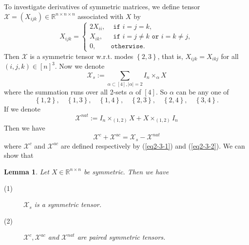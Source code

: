\documentclass[11pt, oneside]{article}  %
\newtheorem{lem}[thm]{Lemma}
\newcommand{\abs}[1]{\left\vert#1\right\vert}
\newcommand{\set}[1]{\left\{#1\right\}}
\newcommand{\al}{\alpha}
\newcommand{\RR}{\mathbb{R}}
\newcommand{\X}{\mathcal{X}}
\newcommand{\beq}{\begin{equation}}
\newcommand{\eeq}{\end{equation}}
\begin{document}
To investigate derivatives of symmetric matrices, we define tensor $\X=(X_{ijk})\in\RR^{n\times n\times n}$ associated with $X$ by 
\[
X_{ijk} = \begin{cases}
2X_{ii},  & \texttt{  if\ }  i=j=k,\\
X_{ik},  & \texttt{  if\ }  i=j\neq k \texttt{ or\ } i=k\neq j, \\ 
0,           & \texttt {otherwise}. 
\end{cases}
\]
Then $\X$ is a symmetric tensor w.r.t. modes $\set{2,3}$, that is,  $X_{ijk}=X_{ikj}$ for all $(i,j,k)\in [n]^{3}$.  Now we denote 
\beq\label{eq3-1:Xs} 
\X_{s} := \sum_{\al\subset [4],\abs{\al}=2} I_{n}\times_{\al} X
\eeq
where the summation runs over all 2-sets $\al$ of $[4]$. So $\al$ can be any one of  
\[ \set{1,2},\quad \set{1,3},\quad \set{1,4},\quad \set{2,3},\quad \set{2,4},\quad \set{3,4}. \]  
If we denote 
\beq\label{eq3-1:X-I-n} 
\X^{nat} := I_{n}\times_{(1,2)} X + X\times_{(1,2)} I_{n}
\eeq
Then we have 
\beq\label{eq3-3-4: c+ac=s}
\X^{c}+\X^{ac} = \X_{s} - \X^{nat}
\eeq
where $\X^{c}$ and $\X^{ac}$ are defined respectively by (\ref{eq2-3-1}) and (\ref{eq2-3-2}).  We can show that 
\begin{lem}\label{le3-5}
Let $X\in\RR^{n\times n}$ be symmetric. Then we have 
\begin{description}
\item[(1)]  $\X_{s}$ is a symmetric tensor.  
\item[(2)]  $\X^{c}, \X^{ac}$ and $\X^{nat}$ are paired symmetric tensors. 
\end{description} 
\end{lem}
\end{document}
